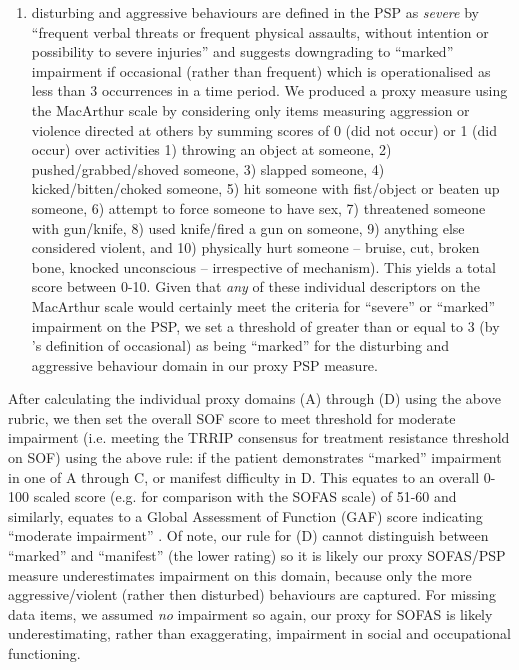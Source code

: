 \documentclass[a4paper,nobib]{article}
\begin{document}
\begin{enumerate}[label=(\Alph*)]
	\item disturbing and aggressive behaviours are defined in the PSP  \citep{Morosini2000} as \emph{severe} by ``frequent verbal threats or frequent physical assaults, without intention or possibility to severe injuries'' and suggests downgrading to ``marked'' impairment if occasional (rather than frequent) which is operationalised as less than 3 occurrences in a time period.  We produced a proxy measure using the MacArthur scale by considering only items measuring aggression or violence directed at others by summing scores of 0 (did not occur) or 1 (did occur) over activities 1) throwing an object at someone, 2) pushed/grabbed/shoved someone, 3) slapped someone, 4) kicked/bitten/choked someone, 5) hit someone with fist/object or beaten up someone, 6) attempt to force someone to have sex, 7) threatened someone with gun/knife, 8) used knife/fired a gun on someone, 9) anything else considered violent, and 10) physically hurt someone -- bruise, cut, broken bone, knocked unconscious -- irrespective of mechanism).  This yields a total score between 0-10. Given that \emph{any} of these individual descriptors on the MacArthur scale would certainly meet the criteria for ``severe'' or ``marked'' impairment on the PSP, we set a threshold of greater than or equal to 3 (by \cite{Morosini2000}'s definition of occasional) as being ``marked'' for the disturbing and aggressive behaviour domain in our proxy PSP measure.
\end{enumerate}

After calculating the individual proxy domains (A) through (D) using the above rubric, we then set the overall SOF score to meet threshold for moderate impairment (i.e. meeting the TRRIP consensus for treatment resistance threshold on SOF) using the above rule: if the patient demonstrates ``marked'' impairment in one of A through C, or manifest difficulty in D.  This equates to an overall 0-100 scaled score (e.g. for comparison with the SOFAS scale) of 51-60 and similarly, equates to a Global Assessment of Function (GAF) score indicating ``moderate impairment'' \citep{Morosini2000}. Of note, our rule for (D) cannot distinguish between ``marked'' and ``manifest'' (the lower rating) so it is likely our proxy SOFAS/PSP measure underestimates impairment on this domain, because only the more aggressive/violent (rather then disturbed) behaviours are captured.  For missing data items, we assumed \emph{no} impairment so again, our proxy for SOFAS is likely underestimating, rather than exaggerating, impairment in social and occupational functioning. 
\end{document}
